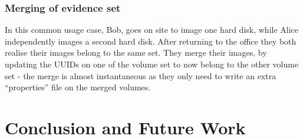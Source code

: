 \documentclass[10pt, conference]{IEEEtran}
\begin{document}
\subsubsection{Merging of evidence set}
In this common usage case, Bob, goes on site to image one hard disk,
while Alice independently images a second hard disk. After returning
to the office they both realise their images belong to the same
set. They merge their images, by updating the UUIDs on one of the
volume set to now belong to the other volume set - the merge is almost
instantaneous as they only need to write an extra ``properties'' file
on the merged volumes.

\section{Conclusion and Future Work}


\end{document}
